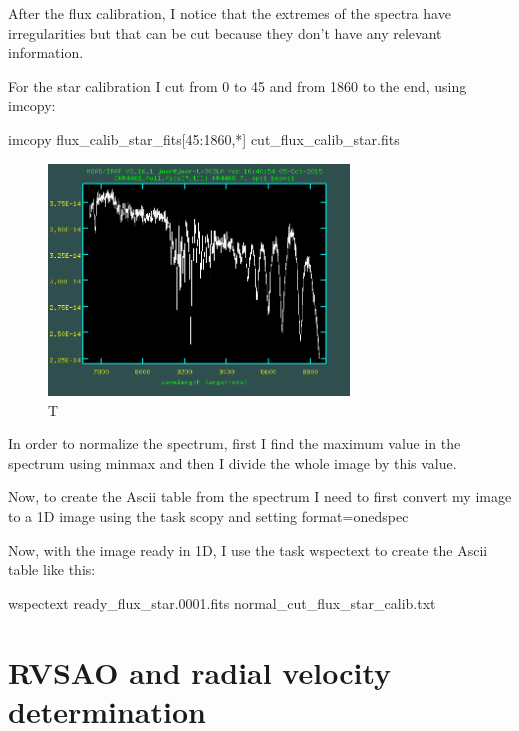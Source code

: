 After the flux calibration, I notice that the extremes of the spectra have irregularities but that can be cut because they don't have any relevant information.

For the star calibration I cut from 0 to 45 and from 1860 to the end, using imcopy:

\begin{center}
imcopy flux\_calib\_star\_fits[45:1860,*] cut\_flux\_calib\_star.fits
\end{center}

\begin{figure}[h]
\centering
\includegraphics[width=8cm]{images/calib_star_flux.png}
\caption{T}
\end{figure}

In order to normalize the spectrum, first I find the maximum value in the spectrum using minmax and then I divide the whole image by this value.

Now, to create the Ascii table from the spectrum I need to first convert my image to a 1D image using the task scopy and setting format=onedspec

Now, with the image ready in 1D, I use the task wspectext to create the Ascii table like this:

\begin{center}
wspectext ready\_flux\_star.0001.fits normal\_cut\_flux\_star\_calib.txt
\end{center}

\section{RVSAO and radial velocity determination}